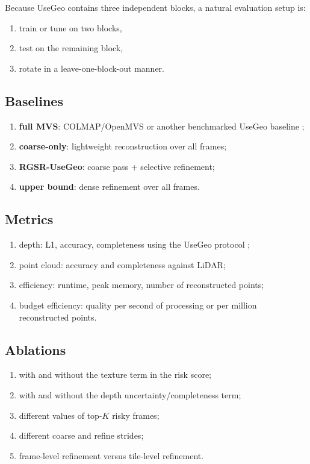 \documentclass[11pt,a4paper]{article}
\begin{document}
Because UseGeo contains three independent blocks, a natural evaluation setup is:
\begin{enumerate}[leftmargin=1.5em]
  \item train or tune on two blocks,
  \item test on the remaining block,
  \item rotate in a leave-one-block-out manner.
\end{enumerate}

\subsection{Baselines}

\begin{enumerate}[leftmargin=1.5em]
  \item \textbf{full MVS}: COLMAP/OpenMVS or another benchmarked UseGeo baseline \citep{Hermann2024UseGeoEval};
  \item \textbf{coarse-only}: lightweight reconstruction over all frames;
  \item \textbf{RGSR-UseGeo}: coarse pass + selective refinement;
  \item \textbf{upper bound}: dense refinement over all frames.
\end{enumerate}

\subsection{Metrics}

\begin{enumerate}[leftmargin=1.5em]
  \item depth: L1, accuracy, completeness using the UseGeo protocol \citep{Hermann2024UseGeoEval};
  \item point cloud: accuracy and completeness against LiDAR;
  \item efficiency: runtime, peak memory, number of reconstructed points;
  \item budget efficiency: quality per second of processing or per million reconstructed points.
\end{enumerate}

\subsection{Ablations}

\begin{enumerate}[leftmargin=1.5em]
  \item with and without the texture term in the risk score;
  \item with and without the depth uncertainty/completeness term;
  \item different values of top-$K$ risky frames;
  \item different coarse and refine strides;
  \item frame-level refinement versus tile-level refinement.
\end{enumerate}
\end{document}
